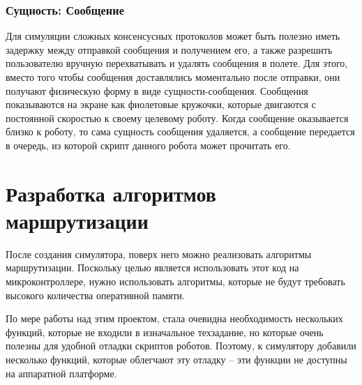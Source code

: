 \documentclass[%
]{report}
\begin{document}
\subsection{Сущность: Сообщение}

Для симуляции сложных консенсусных протоколов
может быть полезно иметь задержку между отправкой сообщения
и получением его,
а также разрешить пользователю вручную перехватывать и удалять сообщения в полете.
Для этого, вместо того чтобы сообщения доставлялись моментально после отправки,
они получают физическую форму в виде сущности-сообщения.
Сообщения показываются на экране как фиолетовые кружочки,
которые двигаются с постоянной скоростью к своему целевому роботу.
Когда сообщение оказывается близко к роботу,
то сама сущность сообщения удаляется,
а сообщение передается в очередь,
из которой скрипт данного робота может прочитать его.

\chapter{Разработка алгоритмов маршрутизации}

После создания симулятора,
поверх него можно реализовать алгоритмы маршрутизации.
Поскольку целью является использовать этот код на микроконтроллере,
нужно использовать алгоритмы, которые не будут требовать высокого
количества оперативной памяти.

По мере работы над этим проектом,
стала очевидна необходимость нескольких функций,
которые не входили в изначальное техзадание,
но которые очень полезны для удобной отладки скриптов роботов.
Поэтому, к симулятору добавили несколько функций,
которые облегчают эту отладку --
эти функции не доступны на аппаратной платформе.
\end{document}
